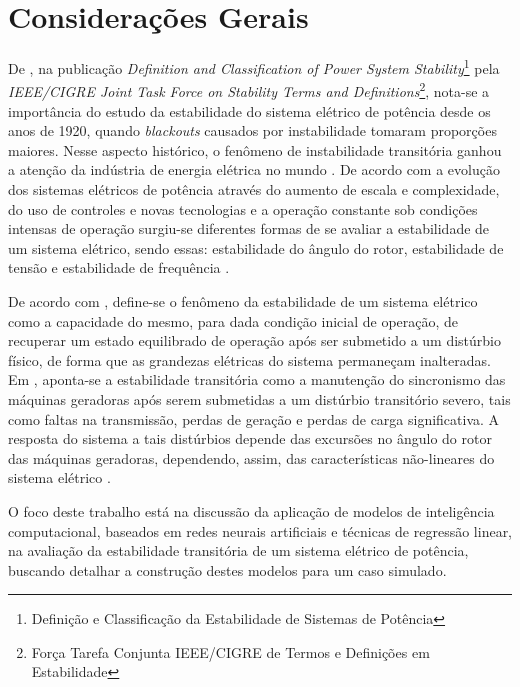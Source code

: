 \documentclass[12pt,oneside,a4paper,chapter=TITLE,section=TITLE,sumario=tradicional,english,brazil]{abntex2}
\begin{document}
	\section{Considerações Gerais}
De \textcite{kundur2004}, na publicação \textit{Definition and Classification of Power System Stability}\footnote{Definição e Classificação da Estabilidade de Sistemas de Potência} pela \textit{IEEE/CIGRE Joint Task Force on Stability Terms and Definitions}\footnote{Força Tarefa Conjunta IEEE/CIGRE de Termos e Definições em Estabilidade}, nota-se a importância do estudo da estabilidade do sistema elétrico de potência desde os anos de 1920, quando \textit{blackouts} causados por instabilidade tomaram proporções maiores. Nesse aspecto histórico, o fenômeno de instabilidade transitória ganhou a atenção da indústria de energia elétrica no mundo \cite{kundur1994}. De acordo com a evolução dos sistemas elétricos de potência através do aumento de escala e complexidade, do uso de controles e novas tecnologias e a operação constante sob condições intensas de operação surgiu-se diferentes formas de se avaliar a estabilidade de um sistema elétrico, sendo essas: estabilidade do ângulo do rotor, estabilidade de tensão e estabilidade de frequência \cite{kundur1994}.\par
	De acordo com \textcite{kundur2004}, define-se o fenômeno da estabilidade de um sistema elétrico como a capacidade do mesmo, para dada condição inicial de operação, de recuperar um estado equilibrado de operação após ser submetido a um distúrbio físico, de forma que as grandezas elétricas do sistema permaneçam inalteradas. Em \textcite{kundur1994}, aponta-se a estabilidade transitória como a manutenção do sincronismo das máquinas geradoras após serem submetidas a um distúrbio transitório severo, tais como faltas na transmissão, perdas de geração e perdas de carga significativa. A resposta do sistema a tais distúrbios depende das excursões no ângulo do rotor das máquinas geradoras, dependendo, assim, das características não-lineares do sistema elétrico \cite{kundur1994}. \par
	O foco deste trabalho está na discussão da aplicação de modelos de inteligência computacional, baseados em redes neurais artificiais e técnicas de regressão linear, na avaliação da estabilidade transitória de um sistema elétrico de potência, buscando detalhar a construção destes modelos para um caso simulado.\par
\end{document}
